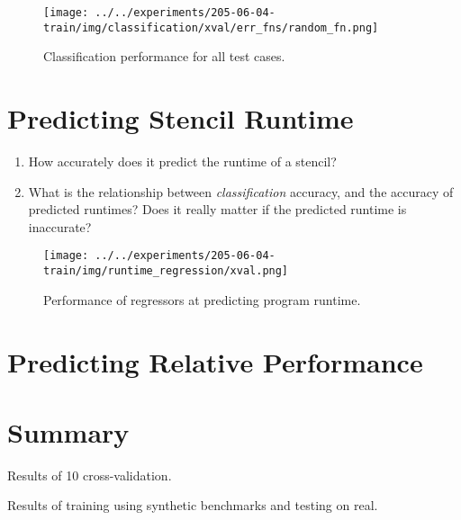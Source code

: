 \begin{figure}
\centering
\texttt{[image: ../../experiments/205-06-04-train/img/classification/xval/err\_fns/random\_fn.png]}
\caption{%
  Classification performance for all test cases.%
}
\end{figure}





\section{Predicting Stencil Runtime}

\begin{enumerate}
\item How accurately does it predict the runtime of a stencil?
\item What is the relationship between \emph{classification} accuracy,
  and the accuracy of predicted runtimes? Does it really matter if the
  predicted runtime is inaccurate?
\end{enumerate}

\begin{figure}
\centering
\texttt{[image: ../../experiments/205-06-04-train/img/runtime\_regression/xval.png]}
\caption{%
  Performance of regressors at predicting program runtime.%
}
\end{figure}


\section{Predicting Relative Performance}


\section{Summary}

\begin{table}
\scriptsize

\caption{Results of 10 cross-validation.}
\end{table}

\begin{table}
\scriptsize

\caption{Results of training using synthetic benchmarks and testing on
  real.}
\end{table}
